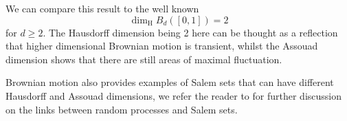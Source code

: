 We can compare this result to the well known \[\dim_{\mathrm{H}} B_d([0,1])=2\] for $d\geq 2$. The Hausdorff dimension being 2 here can be thought as a reflection that higher dimensional Brownian motion is transient, whilst the Assouad dimension shows that there are still areas of maximal fluctuation. 

Brownian motion also provides examples of Salem sets that can have different Hausdorff and Assouad dimensions, we refer the reader to \cite{Ka}  for further discussion on the links between random processes and Salem sets.












